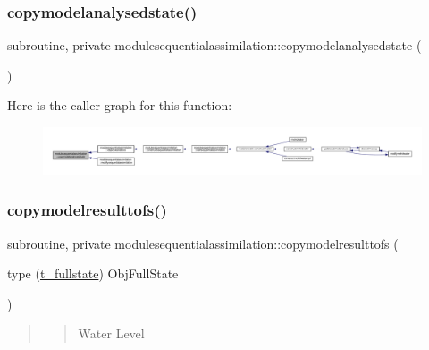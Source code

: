 \subsubsection{\texorpdfstring{copymodelanalysedstate()}{copymodelanalysedstate()}}
{\footnotesize\ttfamily subroutine, private modulesequentialassimilation\+::copymodelanalysedstate (\begin{DoxyParamCaption}{ }\end{DoxyParamCaption})\hspace{0.3cm}{\ttfamily [private]}}

Here is the caller graph for this function\+:\nopagebreak
\begin{figure}[H]
\begin{center}
\leavevmode
\includegraphics[width=350pt]{namespacemodulesequentialassimilation_adcd2e5938f9991a133ebe1cf7eb7ad2f_icgraph}
\end{center}
\end{figure}
\mbox{\label{namespacemodulesequentialassimilation_a1a5a1be9fa72ef3b8fe621128b7e3759}} 
\subsubsection{\texorpdfstring{copymodelresulttofs()}{copymodelresulttofs()}}
{\footnotesize\ttfamily subroutine, private modulesequentialassimilation\+::copymodelresulttofs (\begin{DoxyParamCaption}\item[{type (\mbox{\hyperlink{structmodulesequentialassimilation_1_1t__fullstate}{t\+\_\+fullstate}})}]{Obj\+Full\+State }\end{DoxyParamCaption})\hspace{0.3cm}{\ttfamily [private]}}

\begin{quote}
\begin{quote}
Water Level \end{quote}
\end{quote}


